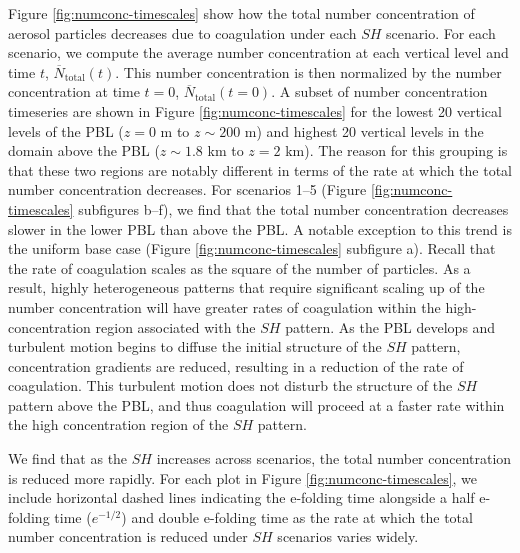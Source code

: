 Figure \ref{fig:numconc-timescales} show how the total number concentration of aerosol particles decreases due to coagulation under each $SH$ scenario. For each scenario, we compute the average number concentration at each vertical level and time $t$, $\overline{N}_{\text{total}}(t)$. This number concentration is then normalized by the number concentration at time $t=0$, $\overline{N}_{\text{total}}(t=0)$. A subset of number concentration timeseries are shown in Figure \ref{fig:numconc-timescales} for the lowest 20 vertical levels of the PBL ($z=0$ m to $z\sim200$ m) and highest 20 vertical levels in the domain above the PBL ($z\sim1.8$ km to $z=2$ km). The reason for this grouping is that these two regions are notably different in terms of the rate at which the total number concentration decreases. For scenarios 1--5 (Figure \ref{fig:numconc-timescales} subfigures b--f), we find that the total number concentration decreases slower in the lower PBL than above the PBL. A notable exception to this trend is the uniform base case (Figure \ref{fig:numconc-timescales} subfigure a). Recall that the rate of coagulation scales as the square of the number of particles. As a result, highly heterogeneous patterns that require significant scaling up of the number concentration will have greater rates of coagulation within the high-concentration region associated with the $SH$ pattern. As the PBL develops and turbulent motion begins to diffuse the initial structure of the $SH$ pattern, concentration gradients are reduced, resulting in a reduction of the rate of coagulation. This turbulent motion does not disturb the structure of the $SH$ pattern above the PBL, and thus coagulation will proceed at a faster rate within the high concentration region of the $SH$ pattern.

We find that as the $SH$ increases across scenarios, the total number concentration is reduced more rapidly. For each plot in Figure \ref{fig:numconc-timescales}, we include horizontal dashed lines indicating the e-folding time alongside a half e-folding time ($e^{-1/2}$) and double e-folding time as the rate at which the total number concentration is reduced under $SH$ scenarios varies widely.  

